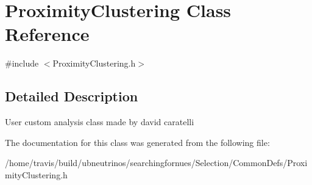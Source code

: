 \hypertarget{classProximityClustering}{}\section{Proximity\+Clustering Class Reference}
\label{classProximityClustering}


{\ttfamily \#include $<$Proximity\+Clustering.\+h$>$}



\subsection{Detailed Description}
User custom analysis class made by david caratelli 

The documentation for this class was generated from the following file\+:\begin{DoxyCompactItemize}
\item 
/home/travis/build/ubneutrinos/searchingfornues/\+Selection/\+Common\+Defs/Proximity\+Clustering.\+h\end{DoxyCompactItemize}

